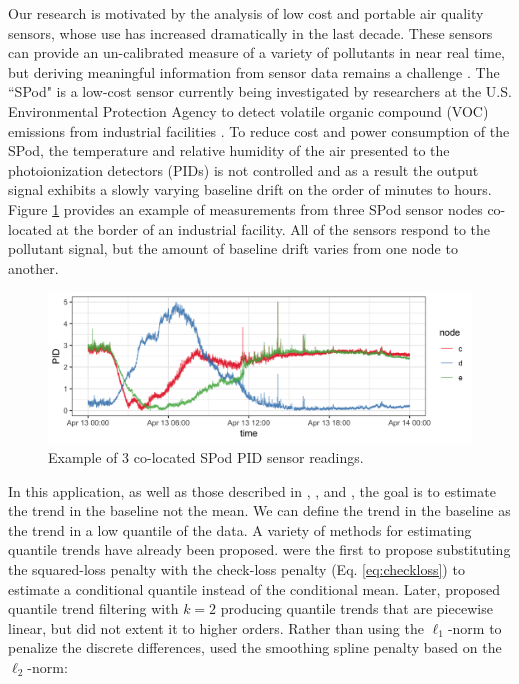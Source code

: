 \documentclass[12pt]{article}
\begin{document}
	
	Our research is motivated by the analysis of low cost and portable air quality sensors, whose use has increased dramatically in the last decade. These sensors can provide an un-calibrated measure of a variety of pollutants in near real time, but deriving meaningful information from sensor data remains a challenge \citep{snyder2013changing}. The ``SPod" is a low-cost sensor currently being investigated by researchers at the U.S. Environmental Protection Agency to detect volatile organic compound (VOC) emissions from industrial facilities \citep{thoma2016south}. To reduce cost and power consumption of the SPod, the temperature and relative humidity of the air presented to the photoionization detectors (PIDs) is not controlled and as a result the output signal exhibits a slowly varying baseline drift on the order of minutes to hours. Figure \ref{fig:raw_spod} provides an example of measurements from three SPod sensor nodes co-located at the border of an industrial facility. All of the sensors respond to the pollutant signal, but the amount of baseline drift varies from one node to another.
	\begin{figure}[t!]
		\includegraphics[width = \linewidth]{Figures/uncorrected_data.png}		
		\caption{Example of 3 co-located SPod PID sensor readings.}
		\label{fig:raw_spod}
	\end{figure}	

	In this application, as well as those described in \cite{Ning2014}, \cite{marandi2015qualitative}, and \cite{pettersson2013algorithm}, the goal is to estimate the trend in the baseline not the mean. We can define the trend in the baseline as the trend in a low quantile of the data. A variety of methods for estimating quantile trends have already been proposed. \cite{Koenker1978} were the first to propose substituting the squared-loss penalty with the check-loss penalty (Eq. \ref{eq:checkloss}) to estimate a conditional quantile instead of the conditional mean. Later, \cite{KoenkerNgPortnoy1994} proposed quantile trend filtering with $k = 2$ producing quantile trends that are piecewise linear, but did not extent it to higher orders. Rather than using the $\ell_1$-norm to penalize the discrete differences, \cite{nychka1995nonparametric} used the smoothing spline penalty based on the $\ell_2$-norm: 
	
\end{document}
